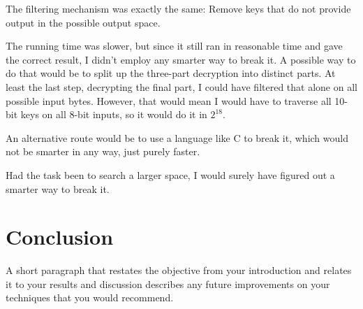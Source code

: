 \documentclass[a4paper,english,12pt]{article}
\begin{document}
The filtering mechanism was exactly the same: Remove keys that do not provide
output in the possible output space.

The running time was slower, but since it still ran in reasonable time and gave
the correct result, I didn't employ any smarter way to break it. A possible way
to do that would be to split up the three-part decryption into distinct parts.
At least the last step, decrypting the final part, I could have filtered that
alone on all possible input bytes. However, that would mean I would have to
traverse all 10-bit keys on all 8-bit inputs, so it would do it in $2^{18}$.

An alternative route would be to use a language like C to break it, which would
not be smarter in any way, just purely faster.

Had the task been to search a larger space, I would surely have figured out a
smarter way to break it.

\section{Conclusion}

A short paragraph that restates the objective from your introduction and
relates it to your results and discussion describes any future improvements on
your techniques that you would recommend.



\end{document}
